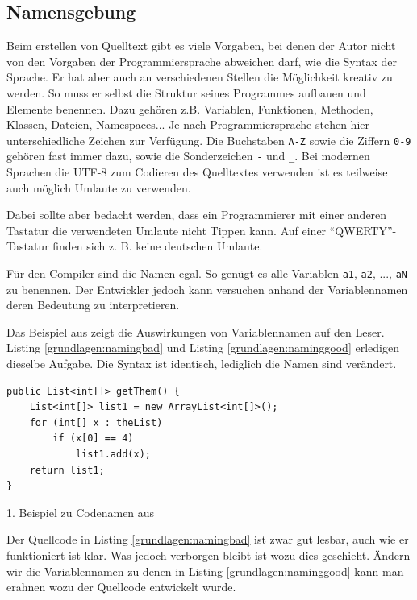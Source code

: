\subsection{Namensgebung}

Beim erstellen von Quelltext gibt es viele Vorgaben, bei denen der Autor nicht von den Vorgaben der Programmiersprache abweichen darf, wie die Syntax der Sprache.
Er hat aber auch an verschiedenen Stellen die Möglichkeit kreativ zu werden. So muss er selbst die Struktur seines Programmes aufbauen und Elemente benennen.
Dazu gehören z.B. Variablen, Funktionen, Methoden, Klassen, Dateien, Namespaces...
Je nach Programmiersprache stehen hier unterschiedliche Zeichen zur Verfügung.
Die Buchstaben \texttt{A-Z} sowie die Ziffern \texttt{0-9} gehören fast immer dazu, sowie die
Sonderzeichen \texttt{-} und \texttt{\_}. Bei modernen Sprachen die UTF-8
zum Codieren des Quelltextes verwenden ist es teilweise auch möglich Umlaute zu verwenden.

Dabei sollte aber bedacht werden, dass ein Programmierer mit einer anderen
Tastatur die verwendeten Umlaute nicht Tippen kann. Auf einer \enquote{QWERTY}-Tastatur finden sich z. B. keine deutschen Umlaute.

Für den Compiler sind die Namen egal. So genügt es alle Variablen \texttt{a1},
\texttt{a2}, ..., \texttt{aN} zu benennen. Der Entwickler jedoch kann versuchen anhand der  Variablennamen deren Bedeutung zu  interpretieren.

Das Beispiel aus \cite[S. 46-47]{Martin} zeigt die Auswirkungen von Variablennamen auf den Leser. Listing \ref{grundlagen:namingbad} und Listing \ref{grundlagen:naminggood} erledigen dieselbe Aufgabe. Die Syntax ist identisch, lediglich die Namen sind verändert.

\begin{listing}
    \begin{verbatim}
public List<int[]> getThem() {
    List<int[]> list1 = new ArrayList<int[]>();
    for (int[] x : theList)
        if (x[0] == 4)
            list1.add(x);
    return list1;
}
    \end{verbatim}
    \caption{1. Beispiel zu Codenamen aus \cite[S. 46]{Martin}}
    \label{grundlagen:namingbad}
\end{listing}

Der Quellcode in Listing \ref{grundlagen:namingbad} ist zwar gut lesbar, auch wie er funktioniert ist klar. Was jedoch verborgen bleibt ist wozu dies geschieht. 
Ändern wir die Variablennamen zu denen in Listing \ref{grundlagen:naminggood} kann man erahnen wozu der Quellcode entwickelt wurde.


